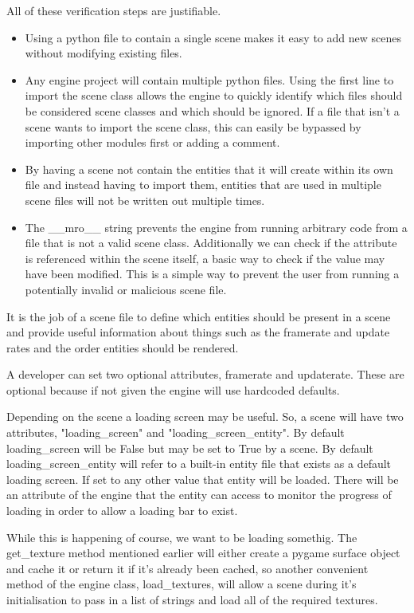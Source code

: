 \documentclass{report}
\begin{document}
All of these verification steps are justifiable.

\begin{itemize}
\renewcommand\labelitemi{--}
    \item Using a python file to contain a single scene makes it easy to add new scenes without modifying existing files.
    \item Any engine project will contain multiple python files. Using the first line to import the scene class allows the engine to quickly identify which files should be considered scene classes and which should be ignored. If a file that isn't a scene wants to import the scene class, this can easily be bypassed by importing other modules first or adding a comment.
    \item By having a scene not contain the entities that it will create within its own file and instead having to import them, entities that are used in multiple scene files will not be written out multiple times.
    \item The \_\_mro\_\_ string prevents the engine from running arbitrary code from a file that is not a valid scene class. Additionally we can check if the attribute is referenced within the scene itself, a basic way to check if the value may have been modified. This is a simple way to prevent the user from running a potentially invalid or malicious scene file.
\end{itemize}

It is the job of a scene file to define which entities should be present in a scene and provide useful information about things such as the framerate and update rates and the order entities should be rendered.

A developer can set two optional attributes, framerate and updaterate. These are optional because if not given the engine will use hardcoded defaults.

Depending on the scene a loading screen may be useful. So, a scene will have two attributes, "loading\_screen" and "loading\_screen\_entity". By default loading\_screen will be False but may be set to True by a scene. By default loading\_screen\_entity will refer to a built-in entity file that exists as a default loading screen. If set to any other value that entity will be loaded. There will be an attribute of the engine that the entity can access to monitor the progress of loading in order to allow a loading bar to exist.

While this is happening of course, we want to be loading somethig. The get\_texture method mentioned earlier will either create a pygame surface object and cache it or return it if it's already been cached, so another convenient method of the engine class, load\_textures, will allow a scene during it's initialisation to pass in a list of strings and load all of the required textures.
\end{document}
